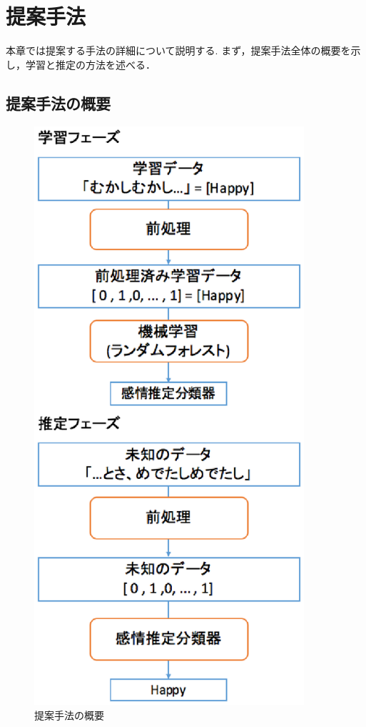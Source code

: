 \chapter{提案手法}
本章では提案する手法の詳細について説明する.
まず，提案手法全体の概要を示し，学習と推定の方法を述べる．


\section{提案手法の概要}
\begin{figure}[ht]
  \begin{center}
    \includegraphics[clip,width=10.0cm]{fig/method-2.eps}
    \caption{提案手法の概要}
    \label{fig:method}
  \end{center}
\end{figure}

